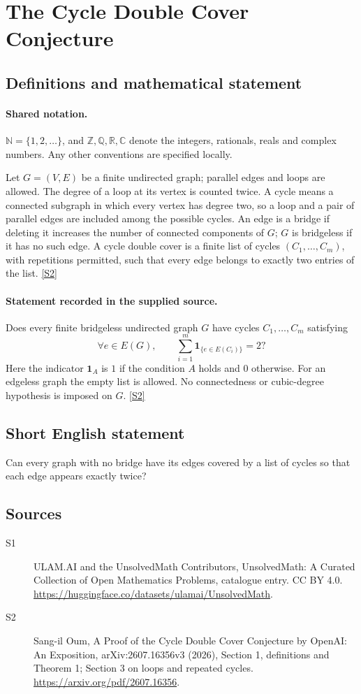 \documentclass[11pt]{article}
\newcommand{\sref}[2]{\hyperlink{source:#1:#2}{[S#2]}}
\begin{document}
\section{The Cycle Double Cover Conjecture}\label{statement}

\subsection{Definitions and mathematical statement}

\paragraph{Shared notation.}$\mathbb N=\{1,2,\ldots\}$, and $\mathbb Z,\mathbb Q,\mathbb R,\mathbb C$ denote the integers, rationals, reals and complex numbers. Any other conventions are specified locally.


Let $G=(V,E)$ be a finite undirected graph; parallel edges and loops are allowed. The degree of a loop at its vertex is counted twice. A cycle means a connected subgraph in which every vertex has degree two, so a loop and a pair of parallel edges are included among the possible cycles. An edge is a bridge if deleting it increases the number of connected components of $G$; $G$ is bridgeless if it has no such edge. A cycle double cover is a finite list of cycles $(C_1,\ldots,C_m)$, with repetitions permitted, such that every edge belongs to exactly two entries of the list. \sref{statement}{2}
\paragraph{Statement recorded in the supplied source.}
Does every finite bridgeless undirected graph $G$ have cycles $C_1,\ldots,C_m$ satisfying
\[
 \forall e\in E(G),\qquad
 \sum_{i=1}^m\mathbf 1_{\{e\in E(C_i)\}}=2?
\]
Here the indicator $\mathbf 1_A$ is $1$ if the condition $A$ holds and $0$ otherwise. For an edgeless graph the empty list is allowed. No connectedness or cubic-degree hypothesis is imposed on $G$. \sref{statement}{2}
\subsection{Short English statement}
Can every graph with no bridge have its edges covered by a list of cycles so that each edge appears exactly twice?
\subsection{Sources}
\begin{description}
\item[\hypertarget{source:statement:1}{S1}] ULAM.AI and the UnsolvedMath Contributors, UnsolvedMath: A Curated Collection of Open Mathematics Problems, catalogue entry. CC BY 4.0. \url{https://huggingface.co/datasets/ulamai/UnsolvedMath}.
\item[\hypertarget{source:statement:2}{S2}] Sang-il Oum, A Proof of the Cycle Double Cover Conjecture by OpenAI: An Exposition, arXiv:2607.16356v3 (2026), Section 1, definitions and Theorem 1; Section 3 on loops and repeated cycles. \url{https://arxiv.org/pdf/2607.16356}.
\end{description}
\label{end:statement}
\end{document}
